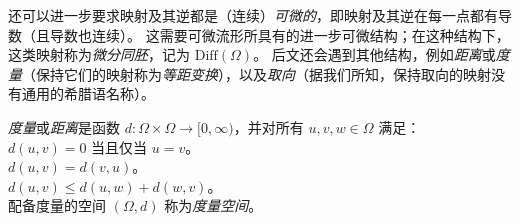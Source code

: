 %
%
还可以进一步要求映射及其逆都是（连续）{\em 可微的}，即映射及其逆在每一点都有导数（且导数也连续）。
%
这需要可微流形所具有的进一步可微结构；在这种结构下，这类映射称为{\em 微分同胚}，记为 $\mathrm{Diff}(\Omega)$。
%
%
后文还会遇到其他结构，例如{\em 距离}或{\em 度量}（保持它们的映射称为{\em 等距变换}），以及{\em 取向}（据我们所知，保持取向的映射没有通用的希腊语名称）。


\begin{tcolorbox}[width=\linewidth,
                  boxsep=0pt,
                  left=7.5pt,
                  right=7.5pt,
                  top=7.5pt,
                  bottom=7.5pt,
                  arc=0pt,
                  boxrule=0pt,toprule=0pt,
                  colback=boxgray,
                  ]%
{\em 度量}或{\em 距离}是函数 $d:\Omega\times\Omega \rightarrow [0,\infty)$，并对所有 $u,v,w \in \Omega$ 满足：\vspace{3mm}\\
     $d(u,v) =0$ 当且仅当 $u=v$。\vspace{2mm}\\
     $d(u,v) = d(v,u)$。\vspace{2mm}\\
     $d(u,v) \leq  d(u,w) + d(w,v)$。\vspace{2mm}\\

配备度量的空间 $(\Omega,d)$ 称为{\em 度量空间}。

\end{tcolorbox}





